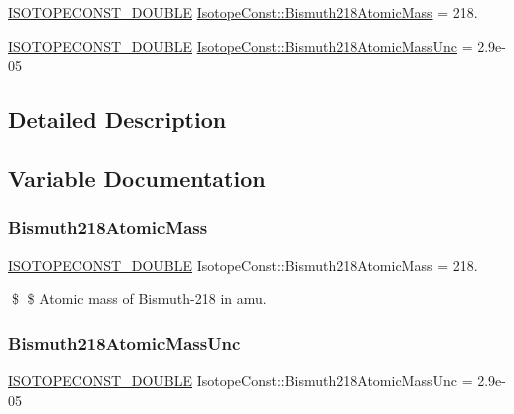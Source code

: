 \begin{DoxyCompactItemize}
\item 
\mbox{\hyperlink{group___isotope_const-_macros_ga8f45a7272ce02c0b4c65c44636ed719a}{I\+S\+O\+T\+O\+P\+E\+C\+O\+N\+S\+T\+\_\+\+D\+O\+U\+B\+LE}} \mbox{\hyperlink{group___isotope_const-_bismuth-_bi218_ga54a409dd307ee6315da079b8b7d7ef33}{Isotope\+Const\+::\+Bismuth218\+Atomic\+Mass}} = 218.
\item 
\mbox{\hyperlink{group___isotope_const-_macros_ga8f45a7272ce02c0b4c65c44636ed719a}{I\+S\+O\+T\+O\+P\+E\+C\+O\+N\+S\+T\+\_\+\+D\+O\+U\+B\+LE}} \mbox{\hyperlink{group___isotope_const-_bismuth-_bi218_gad111d00476d8557b94d46b3d50b319b9}{Isotope\+Const\+::\+Bismuth218\+Atomic\+Mass\+Unc}} = 2.\+9e-\/05
\end{DoxyCompactItemize}


\subsection{Detailed Description}


\subsection{Variable Documentation}
\mbox{\label{group___isotope_const-_bismuth-_bi218_ga54a409dd307ee6315da079b8b7d7ef33}} 
\subsubsection{\texorpdfstring{Bismuth218\+Atomic\+Mass}{Bismuth218AtomicMass}}
{\footnotesize\ttfamily \mbox{\hyperlink{group___isotope_const-_macros_ga8f45a7272ce02c0b4c65c44636ed719a}{I\+S\+O\+T\+O\+P\+E\+C\+O\+N\+S\+T\+\_\+\+D\+O\+U\+B\+LE}} Isotope\+Const\+::\+Bismuth218\+Atomic\+Mass = 218.}

\$ \$ Atomic mass of Bismuth-\/218 in amu. \mbox{\label{group___isotope_const-_bismuth-_bi218_gad111d00476d8557b94d46b3d50b319b9}} 
\subsubsection{\texorpdfstring{Bismuth218\+Atomic\+Mass\+Unc}{Bismuth218AtomicMassUnc}}
{\footnotesize\ttfamily \mbox{\hyperlink{group___isotope_const-_macros_ga8f45a7272ce02c0b4c65c44636ed719a}{I\+S\+O\+T\+O\+P\+E\+C\+O\+N\+S\+T\+\_\+\+D\+O\+U\+B\+LE}} Isotope\+Const\+::\+Bismuth218\+Atomic\+Mass\+Unc = 2.\+9e-\/05}

